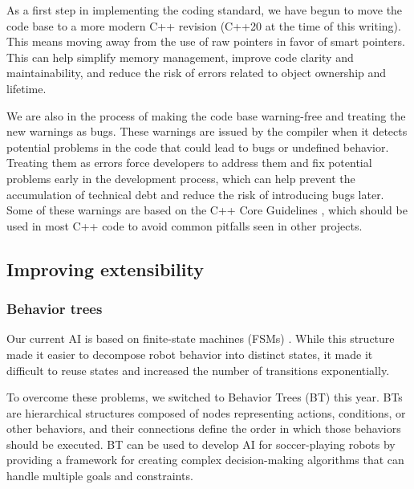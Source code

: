 \documentclass[runningheads]{llncs}
\begin{document}
As a first step in implementing the coding standard, we have begun to move the code base to a more modern C++ revision (C++20 at the time of this writing). This means moving away from the use of raw pointers in favor of smart pointers. This can help simplify memory management, improve code clarity and maintainability, and reduce the risk of errors related to object ownership and lifetime.

We are also in the process of making the code base warning-free and treating the new warnings as bugs. These warnings are issued by the compiler when it detects potential problems in the code that could lead to bugs or undefined behavior. Treating them as errors force developers to address them and fix potential problems early in the development process, which can help prevent the accumulation of technical debt and reduce the risk of introducing bugs later. Some of these warnings are based on the C++ Core Guidelines \cite{ref_cppcoreguidelines}, which should be used in most C++ code to avoid common pitfalls seen in other projects.

\subsection{Improving extensibility}

\subsubsection{Behavior trees}
Our current AI is based on finite-state machines (FSMs) \cite{ref_ETDP2020}. While this structure made it easier to decompose robot behavior into distinct states, it made it difficult to reuse states and increased the number of transitions exponentially. 

To overcome these problems, we switched to Behavior Trees (BT) this year. BTs are hierarchical structures composed of nodes representing actions, conditions, or other behaviors, and their connections define the order in which those behaviors should be executed. BT can be used to develop AI for soccer-playing robots by providing a framework for creating complex decision-making algorithms that can handle multiple goals and constraints.
\end{document}
